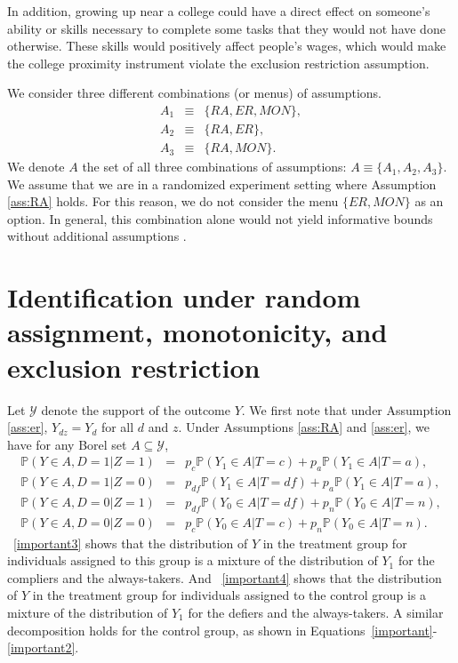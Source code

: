 \documentclass[12pt]{article}
\theoremstyle{plain}
\theoremstyle{definition}
\theoremstyle{remark}
\begin{document}
In addition, growing up near a college could have a direct effect on someone's ability or skills necessary to complete some tasks that they would not have done otherwise. These skills would positively affect people's wages, which would make the college proximity instrument violate the exclusion restriction assumption.

We consider three different combinations (or menus) of assumptions.
\begin{eqnarray*}
    A_1&\equiv&\{RA, ER, MON\},\\
    A_2&\equiv& \{RA,ER\},\\
    A_3&\equiv& \{RA,MON\}.
\end{eqnarray*}
We denote $A$ the set of all three combinations of assumptions: $A\equiv \{A_1,A_2,A_3\}.$ We assume that we are in a randomized experiment setting where Assumption \ref{ass:RA} holds. For this reason, we do not consider the menu $\{ER,MON\}$ as an option. In general, this combination alone would not yield informative bounds without additional assumptions \citep[see][for further details]{Kedagni2023IdentifyingTypes}.

\section{Identification under random assignment, monotonicity, and exclusion restriction}\label{sec:late:ass}
Let $\mathcal{Y}$ denote the support of the outcome $Y$. We first note that under Assumption \ref{ass:er}, $Y_{dz}=Y_{d}$ for all $d$ and $z$. Under Assumptions \ref{ass:RA} and \ref{ass:er}, we have for any Borel set $A\subseteq \mathcal{Y}$, 
\begin{eqnarray}
\label{important3} 
\mathbb{P}(Y \in A, D=1  \vert  Z=1) &=& p_c \mathbb{P}(Y_1 \in A  \vert  T=c)+p_a \mathbb{P}(Y_1 \in A  \vert  T=a), \\
\label{important4}
\mathbb{P}(Y \in A, D=1  \vert  Z=0) &=& p_{df} \mathbb{P}(Y_1 \in A  \vert  T=df)+p_a \mathbb{P}(Y_1 \in A  \vert  T=a),\\
\label{important}
\mathbb{P}(Y \in A, D=0  \vert  Z=1) &=& p_{d f} \mathbb{P}(Y_0 \in A  \vert  T=d f)+p_n \mathbb{P}(Y_0 \in A  \vert  T=n), \\
\label{important2}
\mathbb{P}(Y \in A, D=0  \vert  Z=0) &=& p_c \mathbb{P}(Y_0 \in A  \vert  T=c)+p_n \mathbb{P}(Y_0 \in A  \vert  T=n).
\end{eqnarray}
\equationautorefname~\eqref{important3} shows that the distribution of $Y$ in the treatment group for individuals assigned to this group is a mixture of the distribution of $Y_1$ for the compliers and the always-takers. And \equationautorefname~\eqref{important4} shows that the distribution of $Y$ in the treatment group for individuals assigned to the control group is a mixture of the distribution of $Y_1$ for the defiers and the always-takers. A similar decomposition holds for the control group, as shown in Equations~\eqref{important}-\eqref{important2}.
\end{document}
